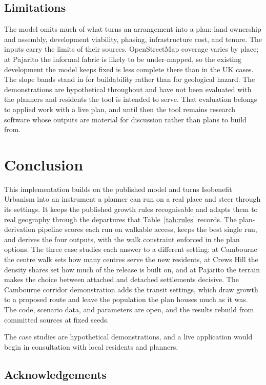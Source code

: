 \documentclass[11pt]{article}
\begin{document}
\subsection{Limitations}

The model omits
much of what turns an arrangement into a plan: land ownership and
assembly, development viability, phasing, infrastructure cost, and
tenure. The
inputs carry the limits of their sources. OpenStreetMap coverage
varies by place; at Pajarito the informal fabric is likely to be
under-mapped, so the existing development the model keeps fixed is
less complete there than in the UK cases. The slope bands stand in
for buildability rather than for geological hazard. The
demonstrations are hypothetical throughout and have not been
evaluated with the planners and residents the tool is intended to
serve. That evaluation belongs to applied work with a live plan, and
until then the tool remains research software whose outputs are
material for discussion rather than plans to build from.

\section{Conclusion}
\label{sec:conclusion}

This implementation builds on the published model and turns Isobenefit
Urbanism into an instrument a planner can run on a real place and
steer through its settings. It
keeps the published growth rules recognisable and adapts them to real
geography through the departures that Table~\ref{tab:rules} records. The
plan-derivation pipeline scores each run on walkable access, keeps
the best single run, and derives the four outputs, with the walk
constraint enforced in the plan options. The three case studies each
answer to a different setting: at Cambourne the centre walk
sets how many centres serve the new residents, at Crews Hill the density
shares set how much of the release is built on, and at Pajarito the
terrain makes the choice between attached and detached settlements
decisive. The Cambourne corridor demonstration adds the transit
settings, which draw growth to a proposed route and leave the
population the plan houses much as it was. The
code, scenario data, and parameters are open,
and the results rebuild from committed sources at fixed seeds.

The case studies are hypothetical demonstrations, and a live
application would begin in consultation with local residents and
planners.

\subsection*{Acknowledgements}
\end{document}
